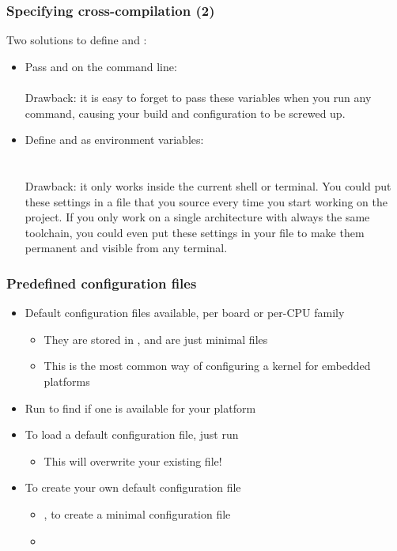 \begin{frame}
  \frametitle{Specifying cross-compilation (2)}

  Two solutions to define  and :

  \begin{itemize}
  \item Pass  and  on the 
    command line: \\
     \\
    Drawback: it is easy to forget to pass these variables when
    you run any  command, causing your build and
    configuration to be screwed up.
  \item Define  and  as environment
    variables: \\
     \\
     \\
    Drawback: it only works inside the current
    shell or terminal. You could put these settings in a file
    that you source every time you start working on the project.
    If you only work on a single architecture with always the 
    same toolchain, you could even put these settings in your
     file to make them permanent and visible from
    any terminal.
  \end{itemize}
\end{frame}

\begin{frame}
  \frametitle{Predefined configuration files}
  \begin{itemize}
  \item Default configuration files available, per board or per-CPU
    family
    \begin{itemize}
    \item They are stored in , and are
      just minimal  files
    \item This is the most common way of configuring a kernel for
      embedded platforms
    \end{itemize}
  \item Run  to find if one is available for your
    platform
  \item To load a default configuration file, just run\\
    \begin{itemize}
    \item This will overwrite your existing  file!
    \end{itemize}
  \item To create your own default configuration file
    \begin{itemize}
    \item {}, to create a minimal
      configuration file
    \item {}
    \end{itemize}
  \end{itemize}
\end{frame}

